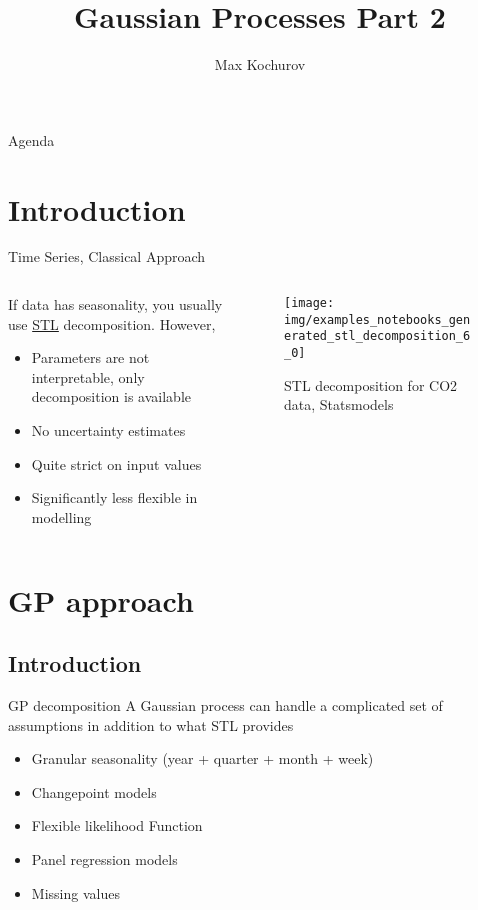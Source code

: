 \documentclass{beamer}
\author{Max Kochurov}
\title[Practical Bayes - Gaussian Processes Part 2]{Gaussian Processes Part 2}
\institute{MSU}
\begin{document}
\begin{frame}
	\maketitle
\end{frame}
\begin{frame}{Agenda}
\tableofcontents
\end{frame}
\section{Introduction}
\begin{frame}{Time Series, Classical Approach}
\begin{columns}
    \begin{column}{0.5\linewidth}
    If data has seasonality, you usually use \href{https://www.statsmodels.org/devel/examples/notebooks/generated/stl_decomposition.html}{STL} decomposition. However,
    \begin{itemize}
        \item Parameters are not interpretable, only decomposition is available
        \item No uncertainty estimates
        \item Quite strict on input values
        \item Significantly less flexible in modelling
    \end{itemize}
    \end{column}
    \begin{column}{0.5\linewidth}
    \begin{figure}
        \centering
        \texttt{[image: img/examples\_notebooks\_generated\_stl\_decomposition\_6\_0]}
        \caption{STL decomposition for CO2 data, Statsmodels}
    \end{figure}
    \end{column}
\end{columns}
\end{frame}
\section{GP approach}
\subsection{Introduction}
\begin{frame}{GP decomposition}
A Gaussian process can handle a complicated set of assumptions in addition to what STL provides
\begin{itemize}
    \item Granular seasonality (year + quarter + month + week)
    \item Changepoint models
    \item Flexible likelihood Function
    \item Panel regression models
    \item Missing values
\end{itemize}
\end{frame}
\end{document}
